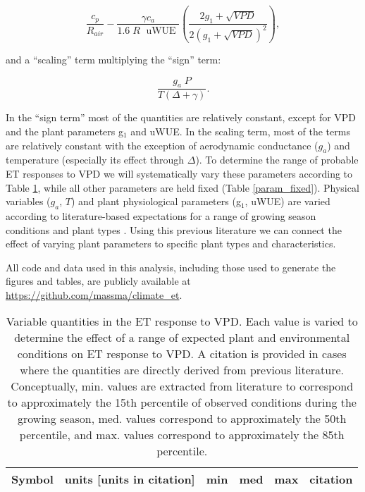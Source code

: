 \begin{equation}
  \label{sign}
  \frac{c_p}{R_{air}} - \frac{\gamma c_a }{1.6 \; R\; \text{ uWUE }} \left( \frac{2 g_1 + \sqrt{VPD}}{2 (g_1 + \sqrt{VPD})^2}\right),
\end{equation}

and a ``scaling'' term multiplying the ``sign'' term:

\begin{equation}
  \frac{g_a \; P}{T(\Delta + \gamma)}.
\end{equation}

In the ``sign term'' most of the quantities are relatively constant,
except for VPD and the plant parameters g$_1$ and uWUE. In the scaling
term, most of the terms are relatively constant with the exception of
aerodynamic conductance ($g_a$) and temperature (especially its effect
through $\Delta$). To determine the range of probable ET responses to
VPD we will systematically vary these parameters according to Table
\ref{param_varying}, while all other parameters are held fixed (Table
\ref{param_fixed}). Physical variables ($g_a$, $T$) and plant
physiological parameters (g$_1$, uWUE) are varied according to
literature-based expectations for a range of growing season conditions
and plant types \citep{Zhou_2015, Medlyn_2017}. Using this previous
literature we can connect the effect of varying plant parameters to
specific plant types and characteristics.

All code and data used in this analysis, including those used to
generate the figures and tables, are publicly available at
\url{https://github.com/massma/climate\_et}.

\begin{table}
  \caption{Variable quantities in the ET response to VPD. Each value
    is varied to determine the effect of a range of expected plant and
    environmental conditions on ET response to VPD. A citation is
    provided in cases where the quantities are directly derived from
    previous literature. Conceptually, min. values are extracted from
    literature to correspond to approximately the 15th percentile of
    observed conditions during the growing season, med. values
    correspond to approximately the 50th percentile, and max. values
    correspond to approximately the 85th percentile.}
  \label{param_varying}
  \centering
  \begin{tabular}{l c c c c c}
    \hline
    Symbol & units [units in citation] & min  & med & max
    & citation  \\
    \hline
    
    \hline
  \end{tabular}
\end{table}


